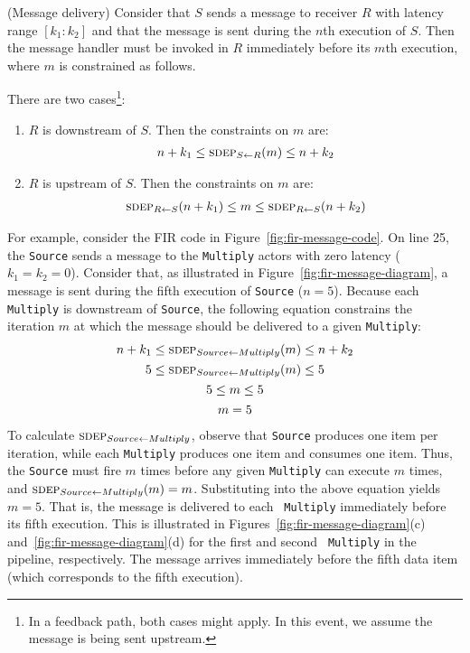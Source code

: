 \documentclass{sig-alternate}
\begin{document}
\begin{definition}(Message delivery)
Consider that $S$ sends a message to receiver $R$ with latency range
$[k_1:k_2]$ and that the message is sent during the $n$th execution of
$S$.  Then the message handler must be invoked in $R$ immediately
before its $m$th execution, where $m$ is constrained as follows.

There are two cases\footnote{\small In a feedback path, both cases might apply.  In this event, we assume the message is being sent upstream.}:
\begin{enumerate}

\item $R$ is downstream of $S$.  Then the constraints on $m$ are:
\[
\begin{array}{l}
n+k_1 \le \sdepf{S}{R}(m) \le n+k_2
\end{array}
\]

\item $R$ is upstream of $S$.  Then the constraints on $m$ are:
\[
\begin{array}{l}
\sdepf{R}{S}(n + k_1) \le m \le \sdepf{R}{S}(n + k_2)
\end{array}
\]
\end{enumerate}
\end{definition}

For example, consider the FIR code in
Figure~\ref{fig:fir-message-code}.  On line 25, the {\tt Source} sends
a message to the {\tt Multiply} actors with zero latency ($k_1 = k_2 =
0$).  Consider that, as illustrated in
Figure~\ref{fig:fir-message-diagram}, a message is sent during the
fifth execution of {\tt Source} ($n = 5$).  Because each {\tt
Multiply} is downstream of {\tt Source}, the following equation
constrains the iteration $m$ at which the message should be delivered
to a given {\tt Multiply}:
\begin{equation*}
\begin{array}{c}
n+k_1 \le \sdepf{Source}{Multiply}(m) \le n + k_2 \\[0.9Ex]
5 \le \sdepf{Source}{Multiply}(m) \le 5 \\[0.9Ex]
5 \le m \le 5 \\[0.9Ex]
m = 5
\end{array}
\end{equation*}
To calculate $\sdepf{Source}{Multiply}$, observe that {\tt Source}
produces one item per iteration, while each {\tt Multiply} produces
one item and consumes one item.  Thus, the {\tt Source} must fire $m$
times before any given {\tt Multiply} can execute $m$ times, and
$\sdepf{Source}{Multiply}(m) = m$.  Substituting into the above
equation yields $m=5$.  That is, the message is delivered to each {\tt
Multiply} immediately before its fifth execution.  This is illustrated
in Figures~\ref{fig:fir-message-diagram}(c)
and~\ref{fig:fir-message-diagram}(d) for the first and second {\tt
Multiply} in the pipeline, respectively.  The message arrives
immediately before the fifth data item (which corresponds to the fifth
execution).
\end{document}
